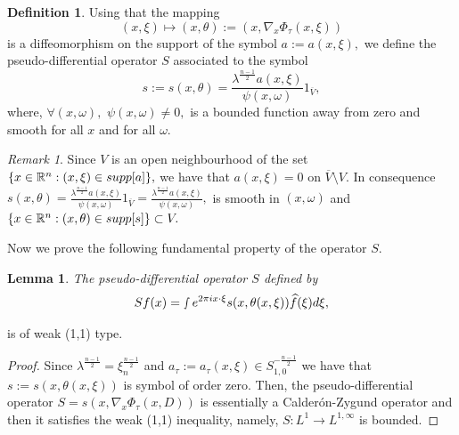 \documentclass[12pt, reqno]{amsart}
\newtheorem{lemma}[theorem]{Lemma}
\theoremstyle{definition}
\newtheorem{definition}[theorem]{Definition}
\theoremstyle{remark}
\newtheorem{remark}[theorem]{Remark}
\numberwithin{equation}{section}
\begin{document}
\begin{definition}
 Using that the mapping $$(x,\xi)\mapsto (x,\theta):=(x, \nabla_x\Phi_\tau(x,\xi))$$ is a diffeomorphism on the support of the symbol $a:=a(x,\xi),$ we define the pseudo-differential operator $S$ associated to the symbol\begin{equation}\label{symbol:s}
   s:= s(x, \theta )=\frac{\lambda^{\frac{n-1}{2}}a(x,\xi)}{\psi(x,\omega)}1_{\overline{V}},
\end{equation}   where, $\forall (x,\omega),$ $\psi(x,\omega)\neq 0,$   is a bounded function away from zero and smooth for all $x$ and for all $\omega$. 
\end{definition}
\begin{remark}
    Since $V$ is an open neighbourhood of the set $\{x\in \mathbb{R}^n:(x,\xi)\in\textnormal{supp}[a]\},$ we have that $a(x,\xi)=0$ on $\overline{V}\setminus V.$ In consequence  $s(x, \theta )=\frac{\lambda^{\frac{n-1}{2}}a(x,\xi)}{\psi(x,\omega)}1_{\overline{V}}=\frac{\lambda^{\frac{n-1}{2}}a(x,\xi)}{\psi(x,\omega)},$ is smooth in $(x,\omega)$ and $\{x\in \mathbb{R}^n:(x,\theta)\in \textnormal{supp}[s] \}\subset V.$ 
\end{remark}
Now we prove the following fundamental property of the operator $S.$
\begin{lemma}
    The pseudo-differential operator $S$ defined by
    \begin{equation}
        Sf(x)=\smallint e^{2\pi i x\cdot \xi}s(x,\theta(x,\xi))\widehat{f}(\xi)d\xi,
    \end{equation}
\end{lemma}is of weak (1,1) type.
\begin{proof} Since $\lambda^{ \frac{n-1}{2} }=\xi_{n}^{ \frac{n-1}{2}}$ and $a_\tau:=a_\tau(x,\xi)\in S^{-\frac{n-1}{2}}_{1,0}$ we have that $s:=s(x,\theta(x,\xi))$ is symbol of order zero. Then, the  pseudo-differential operator $S=s(x,\nabla_x\Phi_\tau(x,D))$ is essentially a Calder\'on-Zygund operator and then it satisfies the weak (1,1) inequality, namely, $S:L^1\rightarrow L^{1,\infty}$ is bounded. 
\end{proof}
\end{document}
